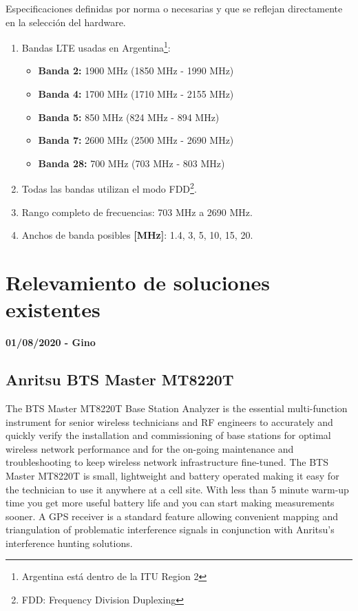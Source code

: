 \documentclass[a4paper,12pt]{report} %
\begin{document}
Especificaciones definidas por norma o necesarias y que se reflejan directamente en la selección del hardware.

\begin{enumerate}
	\item Bandas LTE \cite{bandas_lte} usadas en Argentina\footnote{Argentina está dentro de la ITU Region 2}:
	\begin{itemize}
		\item \textbf{Banda 2:} 1900 MHz (1850 MHz - 1990 MHz)
		\item \textbf{Banda 4:} 1700 MHz (1710 MHz - 2155 MHz)
		\item \textbf{Banda 5:} 850 MHz (824 MHz - 894 MHz)
		\item \textbf{Banda 7:} 2600 MHz (2500 MHz - 2690 MHz)
		\item \textbf{Banda 28:} 700 MHz (703 MHz - 803 MHz)
	\end{itemize}
	\item Todas las bandas utilizan el modo FDD\footnote{FDD: Frequency Division Duplexing}.
	\item Rango completo de frecuencias: 703 MHz a 2690 MHz.
	\item Anchos de banda posibles \textbf{[MHz]}: 1.4, 3, 5, 10, 15, 20.
\end{enumerate}


\chapter{Relevamiento de soluciones existentes}

\textbf{01/08/2020 - Gino}

\section{Anritsu BTS Master MT8220T \cite{anritsu}}

The BTS Master MT8220T Base Station Analyzer is the essential multi-function instrument for senior wireless technicians and RF engineers to accurately and quickly verify the installation and commissioning of base stations for optimal wireless network performance and for the on-going maintenance and troubleshooting to keep wireless network infrastructure fine-tuned.
The BTS Master MT8220T is small, lightweight and battery operated making it easy for the technician to use it anywhere at a cell site. With less than 5 minute warm-up time you get more useful battery life and you can start making measurements sooner. A GPS receiver is a standard feature allowing convenient mapping and triangulation of problematic interference signals in conjunction with Anritsu's interference hunting solutions.
\end{document}
